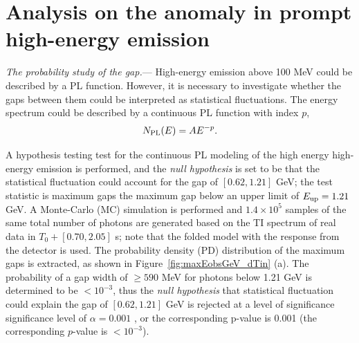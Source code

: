 \documentclass[linenumbers,twocolumn]{aastex631}
\providecommand{\DIFaddtex}[1]{{\protect\color{blue} \sf #1}} %
\providecommand{\DIFdeltex}[1]{{\protect\color{red} \scriptsize #1}} %
\providecommand{\DIFaddbegin}{} %
\providecommand{\DIFaddend}{} %
\providecommand{\DIFdelbegin}{} %
\providecommand{\DIFdelend}{} %
\providecommand{\DIFadd}[1]{\texorpdfstring{\DIFaddtex{#1}}{#1}} %
\providecommand{\DIFdel}[1]{\texorpdfstring{\DIFdeltex{#1}}{}} %
\begin{document}
\section{Analysis on the anomaly in prompt high-energy emission}\label{sec:ana}
\textit{The probability study of the gap.}\label{sec: probstudy}--- High-energy emission above 100 MeV could be described by a PL function. However, it is necessary to investigate whether the gaps between them could be interpreted as statistical fluctuations. 
The energy spectrum could be described by a continuous PL function with index $p$, 
\begin{equation}\label{func:PL}
N_{\rm PL}(E)=A E^{-p}.
\end{equation}


A hypothesis \DIFdelbegin \DIFdel{testing }\DIFdelend \DIFaddbegin \DIFadd{test }\DIFaddend for the continuous PL modeling of the \DIFdelbegin \DIFdel{high energy }\DIFdelend \DIFaddbegin \DIFadd{high-energy }\DIFaddend emission is performed, and the \textit{null hypothesis} is set to be that the statistical fluctuation could account for the gap of $[0.62,1.21]$ GeV; the test statistic is \DIFdelbegin \DIFdel{maximum gaps }\DIFdelend \DIFaddbegin \DIFadd{the maximum gap }\DIFaddend below an upper limit of $E_{\rm up}=1.21$ GeV. %
A Monte-Carlo (MC) simulation is performed and $1.4\times10^5$ samples of the same total number of photons are generated based on the TI spectrum of real data in $T_0+[0.70,2.05]$ s; note that the folded model with the response from the detector is used. The probability density (PD) distribution of the maximum gaps is extracted, as shown in Figure~\ref{fig:maxEobsGeV_dTin} (a). The probability of a gap width of $\geq590$ MeV for photons below 1.21 GeV is determined to be $<10^{-3}$, thus the \textit{null hypothesis} that statistical fluctuation could explain the gap of $[0.62,1.21]$ GeV is rejected at a \DIFdelbegin \DIFdel{level of significance }\DIFdelend \DIFaddbegin \DIFadd{significance level }\DIFaddend of $\alpha=0.001$ \DIFdelbegin \DIFdel{, or the corresponding p-value is 0.001}\DIFdelend \DIFaddbegin \DIFadd{(the corresponding $p$-value is $<10^{-3}$)}\DIFaddend .
\end{document}
